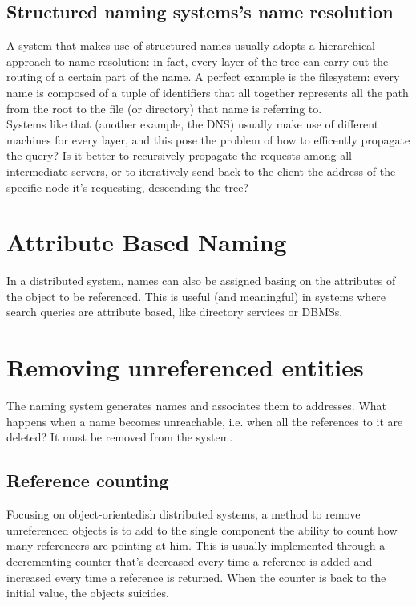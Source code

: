 \documentclass[10pt,a4paper]{article}
\begin{document}
			\subsection{Structured naming systems's name resolution}
				A system that makes use of structured names usually adopts a hierarchical approach to name resolution: in fact, every layer of the tree can carry out the routing of a certain part of the name. A perfect example is the filesystem: every name is composed of a tuple of identifiers that all together represents all the path from the root to the file (or directory) that name is referring to.\\
				Systems like that (another example, the DNS) usually make use of different machines for every layer, and this pose the problem of how to efficently propagate the query? Is it better to recursively propagate the requests among all intermediate servers, or to iteratively send back to the client the address of the specific node it's requesting, descending the tree? 

		\section{Attribute Based Naming}
			In a distributed system, names can also be assigned basing on the attributes of the object to be referenced. This is useful (and meaningful) in systems where search queries are attribute based, like directory services or DBMSs. 
			
		\section{Removing unreferenced entities}
			The naming system generates names and associates them to addresses. What happens when a name becomes unreachable, i.e. when all the references to it are deleted? It must be removed from the system. 
			
			\subsection{Reference counting}
				Focusing on object-orientedish distributed systems, a method to remove unreferenced objects is to add to the single component the ability to count how many referencers are pointing at him. This is usually implemented through a decrementing counter that's decreased every time a reference is added and increased every time a reference is returned. When the counter is back to the initial value, the objects suicides.
\end{document}
